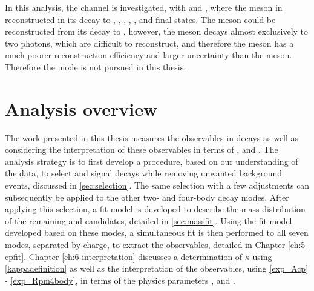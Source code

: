 In this analysis, the \decay{\Bm}{\D\Kstarm} channel is investigated, with \decay{\Kstarm}{\KS\pim} and \decay{\KS}{\pim\pip}, where the \Dz meson in reconstructed in its decay to \Km\pip, \Kp\Km, \pip\pim, \Kp\pim, \Km\pip\pim\pip, \pip\pim\pip\pim and \Kp\pim\pip\pim final states. The \Kstarm meson could be reconstructed from its decay to \Km\piz, however, the \piz meson decays almost exclusively to two photons, which are difficult to reconstruct, and therefore the \piz meson has a much poorer reconstruction efficiency and larger uncertainty than the \KS meson. Therefore the \Km\piz mode is not pursued in this thesis.

\section{Analysis overview}

The work presented in this thesis measures the \CP observables in \decay{\Bm}{\D\Kstarm} decays as well as considering the interpretation of these observables in terms of \rb, \deltab and \Pgamma. The analysis strategy is to first develop a procedure, based on our understanding of the data, to select \decay{\Bm}{\D(\Km\pip)\Kstarm} and \kpipipi signal decays while removing unwanted background events, discussed in \sect\ref{sec:selection}. The same selection with a few adjustments can subsequently be applied to the other two- and four-body \D decay modes. After applying this selection, a fit model is developed to describe the \B mass distribution of the remaining \decay{\Bm}{\D(\Km\pip)\Kstarm} and \kpipipi candidates, detailed in \sect\ref{sec:massfit}. Using the fit model developed based on these modes, a simultaneous fit is then performed to all seven \D modes, separated by \B charge, to extract the \CP observables, detailed in Chapter \ref{ch:5-cpfit}. Chapter \ref{ch:6-interpretation} discusses a determination of $\kappa$ using \eqn\ref{kappadefinition} as well as the interpretation of the \CP observables, using \eqns\ref{exp_Acp} - \ref{exp_Rpm4body}, in terms of the physics parameters \rb, \deltab and \Pgamma.